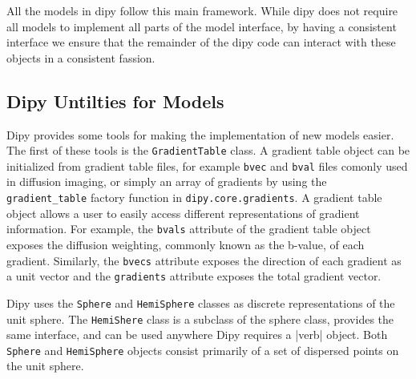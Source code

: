 All the models in dipy follow this main framework. While dipy does not require all models to implement all parts of the model interface, by having a consistent interface we ensure that the remainder of the dipy code can interact with these objects in a consistent fassion.

\subsection{Dipy Untilties for Models}
Dipy provides some tools for making the implementation of new models easier. The first of these tools is the \verb|GradientTable| class. A gradient table object can be initialized from gradient table files, for example \verb|bvec| and \verb|bval| files comonly used in diffusion imaging, or simply an array of gradients by using the \verb|gradient_table| factory function in \verb|dipy.core.gradients|. A gradient table object allows a user to easily access different representations of gradient information. For example, the \verb|bvals| attribute of the gradient table object exposes the diffusion weighting, commonly known as the b-value, of each gradient. Similarly, the \verb|bvecs| attribute exposes the direction of each gradient as a unit vector and the \verb|gradients| attribute exposes the total gradient vector.

Dipy uses the \verb|Sphere| and \verb|HemiSphere| classes as discrete representations of the unit sphere. The \verb|HemiShere| class is a subclass of the sphere class, provides the same interface, and can be used anywhere Dipy requires a \Sphere|verb| object. Both \verb|Sphere| and \verb|HemiSphere| objects consist primarily of a set of dispersed points on the unit sphere. 
